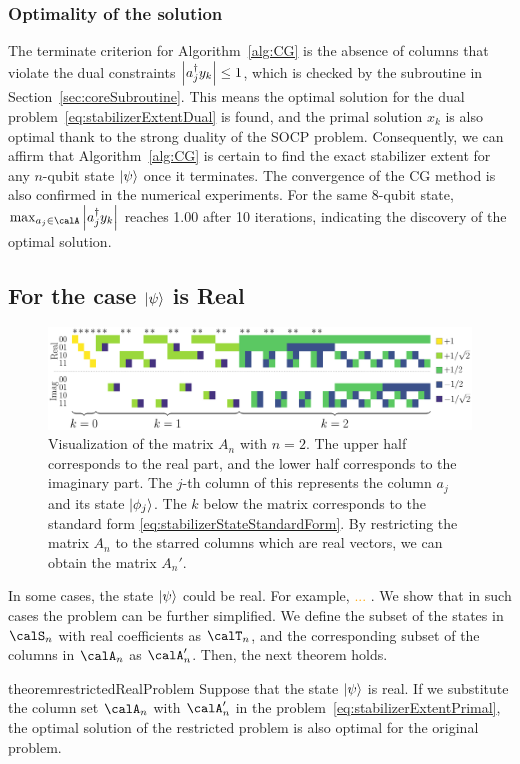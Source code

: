 \documentclass[a4paper, onecolumn, 11pt, longbibliography]{quantumarticle}
\newcommand{\orange}[1]{\textcolor{orange}{#1}}
\begin{document}
\subsubsection{Optimality of the solution}

The terminate criterion for Algorithm~\ref{alg:CG}
is the absence of columns that violate
the dual constraints $\abs{a_j^\dagger y_k} \leq 1$,
which is checked by the subroutine in Section~\ref{sec:coreSubroutine}.
This means the optimal solution for the
dual problem~\eqref{eq:stabilizerExtentDual}
is found, and the primal solution $x_k$ is also optimal
thank to the strong duality of the SOCP problem.
Consequently, we can affirm that
Algorithm~\ref{alg:CG} is certain to
find the exact stabilizer extent
for any $n$-qubit state $\ket{\psi}$
once it terminates.
The convergence of the CG method
is also confirmed in the numerical experiments.
For the same 8-qubit state,
$\max_{a_j \in \calA} \abs{a_j^\dagger y_k}$
reaches 1.00 after 10 iterations,
indicating the discovery of the optimal solution.

\subsection{For the case $\ket{\psi}$ is Real}
\label{sec:restrictedRealProblem}

\begin{figure}[htbp]
  \centering
  \includegraphics[width=\columnwidth]{imgs/Amat.pdf}
  \caption{
    Visualization of the matrix $A_n$ with $n=2$.
    The upper half corresponds to the real part,
    and the lower half corresponds to the imaginary part.
    The $j$-th column of this represents
    the column $a_j$ and its state $\ket{\phi_j}$.
    The $k$ below the matrix
    corresponds to
    the standard form \eqref{eq:stabilizerStateStandardForm}.
    By restricting the matrix $A_n$
    to the starred columns
    which are real vectors,
    we can obtain the matrix $A_n'$.
  }
  \label{fig:Amat}
\end{figure}

In some cases, the state $\ket{\psi}$ could be real.
For example, \orange{...} .
We show that in such cases the problem can be further simplified.
We define the subset of the states in $\calS_n$ with real coefficients as $\calT_n$,
and the corresponding subset of the columns in $\calA_n$ as $\calA'_n$.
Then, the next theorem holds.
\begin{restatable}{theorem}{restrictedRealProblem}
  \label{thm:restrictedRealProblem}
  Suppose that the state $\ket{\psi}$ is real.
  If we substitute the column set $\calA_n$ with $\calA'_n$
  in the problem~\eqref{eq:stabilizerExtentPrimal},
  the optimal solution of the restricted problem
  is also optimal for the original problem.
\end{restatable}
\end{document}
